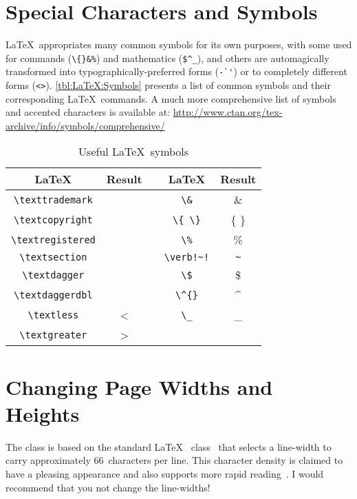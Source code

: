 \section{Special Characters and Symbols}
\label{sec:SpecialSymbols}

\LaTeX\ appropriates many common symbols for its own purposes,
with some used for commands (\eg \verb+\{}&%+) and
mathematics (\eg \verb+$^_+), and others are automagically transformed
into typographically-preferred forms (\eg \verb+-`'+) or to
completely different forms (\eg \verb+<>+).
\autoref{tbl:LaTeX:Symbols} presents a list of common symbols and
their corresponding \LaTeX\ commands.  A much more comprehensive list 
of symbols and accented characters is available at:
\url{http://www.ctan.org/tex-archive/info/symbols/comprehensive/}
\begin{table}
\caption{Useful \LaTeX\ symbols}\label{tbl:LaTeX:Symbols}
\centering\begin{tabular}{ccp{0.5cm}cc}\toprule
	\LaTeX & Result && \LaTeX & Result \\
	\midrule
	\verb+\texttrademark+ & \texttrademark && \verb+\&+ & \& \\
	\verb+\textcopyright+ & \textcopyright && \verb+\{ \}+ & \{ \} \\
	\verb+\textregistered+ & \textregistered && \verb+\%+ & \% \\
	\verb+\textsection+ & \textsection && \verb+\verb!~!+ & \verb!~! \\
	\verb+\textdagger+ & \textdagger && \verb+\$+ & \$ \\
	\verb+\textdaggerdbl+ & \textdaggerdbl && \verb+\^{}+ & \^{} \\
	\verb+\textless+ & \textless && \verb+\_+ & \_ \\
	\verb+\textgreater+ & \textgreater && \\
	\bottomrule
\end{tabular}
\end{table}

\section{Changing Page Widths and Heights}

The  class is based on the standard \LaTeX\ 
class~\cite{lamport-1994-ladps} that selects a line-width to carry
approximately 66~characters per line.  This character density is
claimed to have a pleasing appearance and also supports more rapid
reading~\cite{bringhurst-2002-teots}.  I would recommend that you
not change the line-widths!

